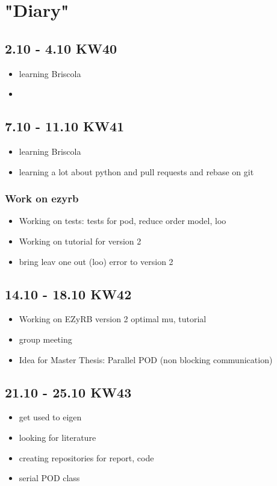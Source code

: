 \chapter{"Diary"}
\section{2.10 - 4.10 KW40}
\begin{itemize}
    \item learning Briscola
    \item 
\end{itemize}
\section{7.10 - 11.10 KW41}
\begin{itemize}
    \item learning Briscola
    \item learning a lot about python and pull requests and rebase on git
\end{itemize}
\subsection{Work on ezyrb}
\begin{itemize}
    \item Working on tests: tests for pod, reduce order model, loo
    \item Working on tutorial for version 2
    \item bring leav one out (loo) error to version 2
\end{itemize}

\section{14.10 - 18.10 KW42}

\begin{itemize}
	\item Working on EZyRB version 2 optimal mu, tutorial
	\item group meeting
	\item Idea for Master Thesis: Parallel POD (non blocking communication)
\end{itemize}

\section{21.10 - 25.10 KW43}

\begin{itemize}
	\item get used to eigen
	\item looking for literature
	\item creating repositories for report, code
	\item serial POD class
\end{itemize}

